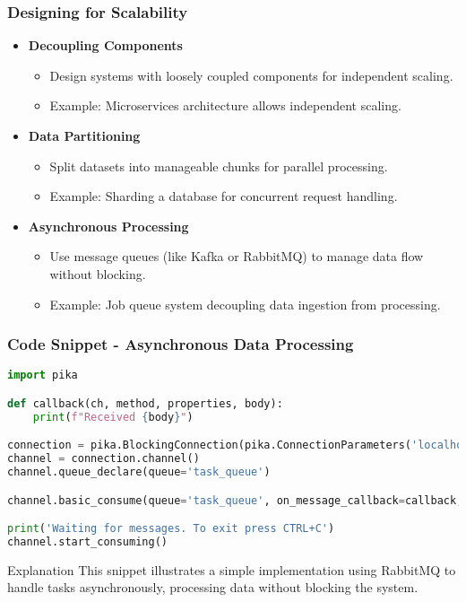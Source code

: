 \documentclass{beamer}
\begin{document}
\begin{frame}
    \frametitle{Designing for Scalability}
    \begin{itemize}
        \item \textbf{Decoupling Components}
            \begin{itemize}
                \item Design systems with loosely coupled components for independent scaling.
                \item Example: Microservices architecture allows independent scaling.
            \end{itemize}
        
        \item \textbf{Data Partitioning}
            \begin{itemize}
                \item Split datasets into manageable chunks for parallel processing.
                \item Example: Sharding a database for concurrent request handling.
            \end{itemize}
        
        \item \textbf{Asynchronous Processing}
            \begin{itemize}
                \item Use message queues (like Kafka or RabbitMQ) to manage data flow without blocking.
                \item Example: Job queue system decoupling data ingestion from processing.
            \end{itemize}
    \end{itemize}
\end{frame}

\begin{frame}[fragile]
    \frametitle{Code Snippet - Asynchronous Data Processing}
    \begin{lstlisting}[language=Python]
import pika

def callback(ch, method, properties, body):
    print(f"Received {body}")

connection = pika.BlockingConnection(pika.ConnectionParameters('localhost'))
channel = connection.channel()
channel.queue_declare(queue='task_queue')

channel.basic_consume(queue='task_queue', on_message_callback=callback, auto_ack=True)

print('Waiting for messages. To exit press CTRL+C')
channel.start_consuming()
    \end{lstlisting}
    \begin{block}{Explanation}
    This snippet illustrates a simple implementation using RabbitMQ to handle tasks asynchronously, 
    processing data without blocking the system.
    \end{block}
\end{frame}
\end{document}
